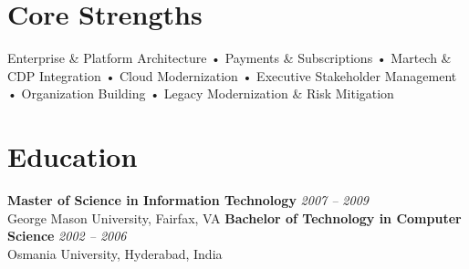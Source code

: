\documentclass[11pt]{article}
\begin{document}
\section*{Core Strengths}
Enterprise \& Platform Architecture • Payments \& Subscriptions • Martech \& CDP Integration • Cloud Modernization • Executive Stakeholder Management • Organization Building • Legacy Modernization \& Risk Mitigation

\section*{Education}
\textbf{Master of Science in Information Technology} \hfill \textit{2007 -- 2009} \\
George Mason University, Fairfax, VA
\newline
\textbf{Bachelor of Technology in Computer Science} \hfill \textit{2002 -- 2006} \\
Osmania University, Hyderabad, India
\end{document}
